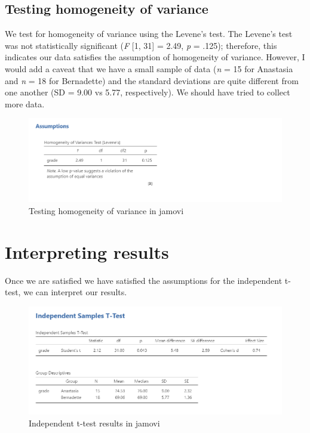 \documentclass[
]{book}
\begin{document}
\hypertarget{testing-homogeneity-of-variance}{%
\subsection{Testing homogeneity of variance}\label{testing-homogeneity-of-variance}}

We test for homogeneity of variance using the Levene's test. The Levene's test was not statistically significant (\emph{F} {[}1, 31{]} = 2.49, \emph{p} = .125); therefore, this indicates our data satisfies the assumption of homogeneity of variance. However, I would add a caveat that we have a small sample of data (\emph{n} = 15 for Anastasia and \emph{n} = 18 for Bernadette) and the standard deviations are quite different from one another (SD = 9.00 vs 5.77, respectively). We should have tried to collect more data.

\begin{figure}

{\centering \includegraphics[width=1\linewidth]{images/02-independent_t-test/independent_t-test_homogeneity} 

}

\caption{Testing homogeneity of variance in jamovi}\label{fig:unnamed-chunk-4}
\end{figure}

\hypertarget{interpreting-results}{%
\section{Interpreting results}\label{interpreting-results}}

Once we are satisfied we have satisfied the assumptions for the independent t-test, we can interpret our results.

\begin{figure}

{\centering \includegraphics[width=1\linewidth]{images/02-independent_t-test/independent_t-test_ind-results} 

}

\caption{Independent t-test results in jamovi}\label{fig:unnamed-chunk-5}
\end{figure}
\end{document}
